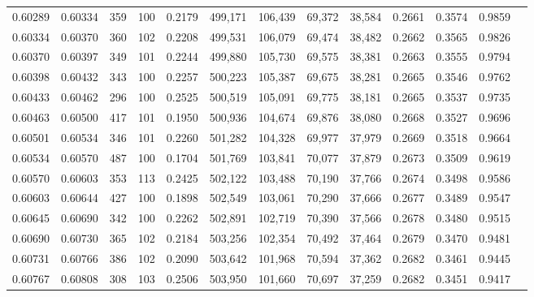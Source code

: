 \begin{tabular}{rrrrrrrrrrrrr}
0.60289 & 0.60334 &   359 & 100 &                                     0.2179 & 499,171 & 106,439 &  69,372 &  38,584 & 0.2661 & 0.3574 & 0.9859 \\
0.60334 & 0.60370 &   360 & 102 &                                     0.2208 & 499,531 & 106,079 &  69,474 &  38,482 & 0.2662 & 0.3565 & 0.9826 \\
0.60370 & 0.60397 &   349 & 101 &                                     0.2244 & 499,880 & 105,730 &  69,575 &  38,381 & 0.2663 & 0.3555 & 0.9794 \\
0.60398 & 0.60432 &   343 & 100 &                                     0.2257 & 500,223 & 105,387 &  69,675 &  38,281 & 0.2665 & 0.3546 & 0.9762 \\
0.60433 & 0.60462 &   296 & 100 &                                     0.2525 & 500,519 & 105,091 &  69,775 &  38,181 & 0.2665 & 0.3537 & 0.9735 \\
0.60463 & 0.60500 &   417 & 101 &                                     0.1950 & 500,936 & 104,674 &  69,876 &  38,080 & 0.2668 & 0.3527 & 0.9696 \\
0.60501 & 0.60534 &   346 & 101 &                                     0.2260 & 501,282 & 104,328 &  69,977 &  37,979 & 0.2669 & 0.3518 & 0.9664 \\
0.60534 & 0.60570 &   487 & 100 &                                     0.1704 & 501,769 & 103,841 &  70,077 &  37,879 & 0.2673 & 0.3509 & 0.9619 \\
0.60570 & 0.60603 &   353 & 113 &                                     0.2425 & 502,122 & 103,488 &  70,190 &  37,766 & 0.2674 & 0.3498 & 0.9586 \\
0.60603 & 0.60644 &   427 & 100 &                                     0.1898 & 502,549 & 103,061 &  70,290 &  37,666 & 0.2677 & 0.3489 & 0.9547 \\
0.60645 & 0.60690 &   342 & 100 &                                     0.2262 & 502,891 & 102,719 &  70,390 &  37,566 & 0.2678 & 0.3480 & 0.9515 \\
0.60690 & 0.60730 &   365 & 102 &                                     0.2184 & 503,256 & 102,354 &  70,492 &  37,464 & 0.2679 & 0.3470 & 0.9481 \\
0.60731 & 0.60766 &   386 & 102 &                                     0.2090 & 503,642 & 101,968 &  70,594 &  37,362 & 0.2682 & 0.3461 & 0.9445 \\
0.60767 & 0.60808 &   308 & 103 &                                     0.2506 & 503,950 & 101,660 &  70,697 &  37,259 & 0.2682 & 0.3451 & 0.9417 \\

\end{tabular}
